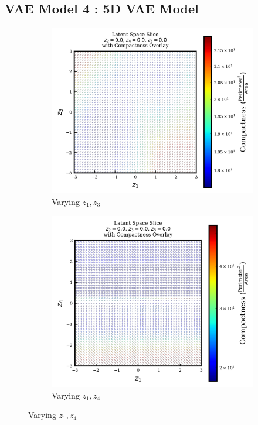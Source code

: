 \documentclass{article}
\begin{document}
\subsection{VAE Model 4 : 5D VAE Model}\label{model4_appendix}

\begin{figure}[H]
    \centering
    \begin{subfigure}{0.45\textwidth}
        \includegraphics[width=\linewidth]{figures/VAEmodels/model4/varying_z1_z3_fixed_z2=0.0_z4=0.0_z5=0.0.png}
        \caption{Varying $z_1, z_3$}
    \end{subfigure}
    \hfill
    \begin{subfigure}{0.45\textwidth}
        \includegraphics[width=\linewidth]{figures/VAEmodels/model4/varying_z1_z4_fixed_z2=0.0_z3=0.0_z5=0.0.png}
        \caption{Varying $z_1, z_4$}
    \end{subfigure}
    

\end{figure}
\end{document}
